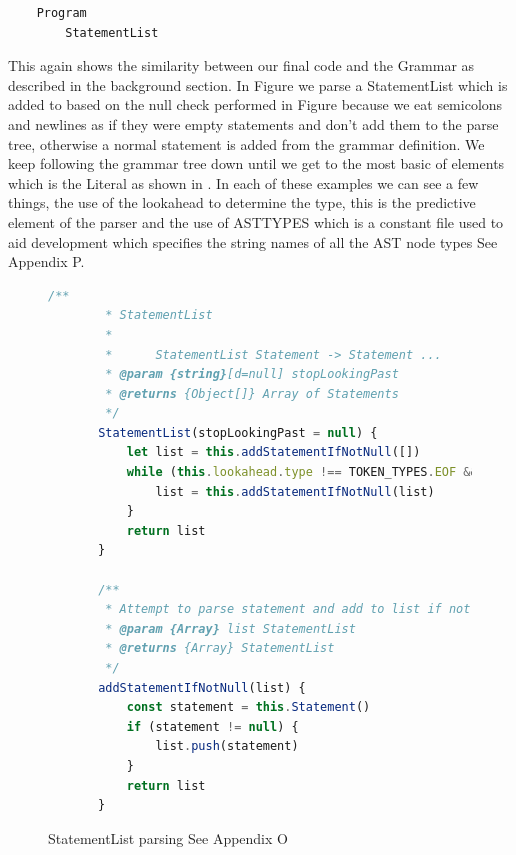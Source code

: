 \begin{verbatim}
    Program
        StatementList
\end{verbatim}
This again shows the similarity between our final code and the Grammar as described in the background section. In Figure  we parse a 
StatementList which is added to based on the null check performed in Figure  because we eat semicolons and newlines as if they were empty statements 
and don't add them to the parse tree, otherwise a normal statement is added from the grammar definition. We keep following the grammar tree down until we get to 
the most basic of elements which is the Literal as shown in .
\newline
In each of these examples we can see a few things, the use of the lookahead to determine the type, this is the predictive element of the parser and the use of 
AST\textunderscore{}TYPES which is a constant file used to aid development which specifies the string names of all the AST node types See Appendix P.
\begin{figure}[h]
    \begin{lstlisting}[language=Javascript]
        /**
        * StatementList
        * 
        *      StatementList Statement -> Statement ...
        * @param {string}[d=null] stopLookingPast 
        * @returns {Object[]} Array of Statements
        */
       StatementList(stopLookingPast = null) {
           let list = this.addStatementIfNotNull([])
           while (this.lookahead.type !== TOKEN_TYPES.EOF && this.lookahead.type !== stopLookingPast) {
               list = this.addStatementIfNotNull(list)
           }
           return list
       }
   
       /**
        * Attempt to parse statement and add to list if not null
        * @param {Array} list StatementList
        * @returns {Array} StatementList
        */
       addStatementIfNotNull(list) {
           const statement = this.Statement()
           if (statement != null) {
               list.push(statement)
           }
           return list
       }
    \end{lstlisting}
    \caption{StatementList parsing See Appendix O}
    \label{fig:parser2}
\end{figure}

